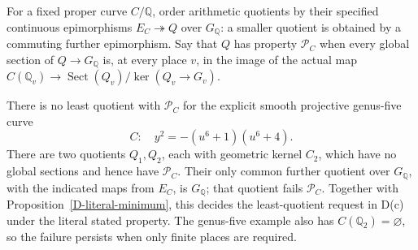 \begin{theorem}
\label{D-no-least-quotient}
For a fixed proper curve $C/\mathbb Q$, order arithmetic
quotients by their specified continuous epimorphisms
$E_C\twoheadrightarrow Q$ over $G_{\mathbb Q}$:
a smaller quotient is obtained by a commuting further
epimorphism. Say that $Q$ has property $\mathcal P_C$
when every global section of $Q\to G_{\mathbb Q}$ is,
at every place $v$, in the image of the actual map
$C(\mathbb Q_v)\to\operatorname{Sect}(Q_v)/\ker(Q_v\to G_v)$.

There is no least quotient with $\mathcal P_C$ for
the explicit smooth projective genus-five curve
\[
 C:\quad y^2=-(u^6+1)(u^6+4).
 \tag{D11.1}
\]
There are two quotients $Q_1,Q_2$, each with geometric
kernel $C_2$, which have no global sections and hence
have $\mathcal P_C$. Their only common further quotient
over $G_{\mathbb Q}$, with the indicated maps from $E_C$,
is $G_{\mathbb Q}$; that quotient fails $\mathcal P_C$.
Together with Proposition~\ref{D-literal-minimum}, this
decides the least-quotient request in D(c) under the
literal stated property. The genus-five example also
has $C(\mathbb Q_2)=\varnothing$, so the failure persists
when only finite places are required.
\end{theorem}
